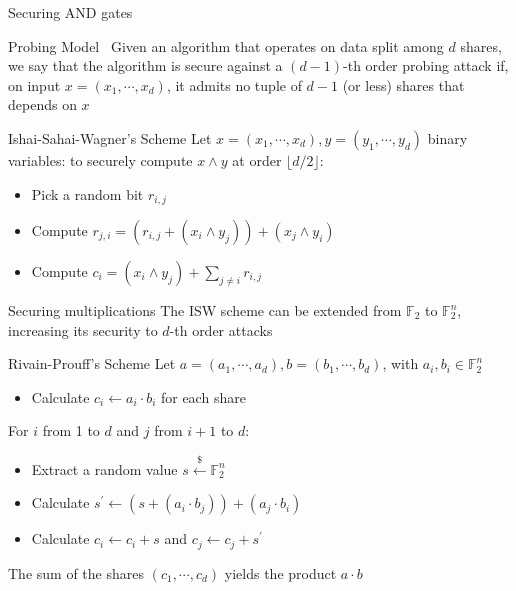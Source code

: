 \begin{frame}{Securing AND gates}
    \begin{block}{Probing Model~\cite{ishai2003private}}
        Given an algorithm that operates on data split among $d$ shares, we say that the algorithm is 
        secure against a $(d-1)$-th order probing attack if, on input $x = (x_1, \cdots, x_d)$, it admits no
        tuple of $d-1$ (or less) shares that depends on $x$
    \end{block}
    \begin{block}{Ishai-Sahai-Wagner’s Scheme}
        Let $x = (x_1, \cdots, x_d), y = (y_1, \cdots, y_d)$ binary variables: to securely compute $x \wedge y$ at order $\lfloor d/2 \rfloor$:
        \begin{itemize}
            \item Pick a random bit $r_{i, j}$
            \item Compute $r_{j, i} = (r_{i, j} + (x_i \wedge y_j)) + (x_j \wedge y_i)$
            \item Compute $c_i = (x_i \wedge y_j) + \sum_{j \neq i} r_{i, j}$ 
        \end{itemize}
    \end{block}
\end{frame}

\begin{frame}{Securing multiplications}
    The ISW scheme can be extended from $\mathds{F}_2$ to $\mathds{F}_2^{n}$, increasing its security to $d$-th order attacks
    \begin{block}{Rivain-Prouff's Scheme}
        Let $a = (a_1, \cdots, a_d), b = (b_1, \cdots, b_d)$, with $ a_i, b_i \in \mathds{F}_2^n$
        \begin{itemize}
            \item Calculate $c_i \leftarrow a_i\cdot b_i$ for each share
        \end{itemize}
        For $i$ from 1 to $d$ and $j$ from $i+1$ to $d$:
        \begin{itemize}
            \item Extract a random value $s \xleftarrow{\$} \mathds{F}_2^n$
            \item Calculate $s^{'} \leftarrow (s + (a_i \cdot b_j)) + (a_j \cdot b_i)$
            \item Calculate $c_i \leftarrow c_i + s$ and  $c_j \leftarrow c_j + s^{'}$ 
        \end{itemize}
        The sum of the shares $(c_1, \cdots, c_d)$ yields the product $a\cdot b$
    \end{block}
\end{frame}